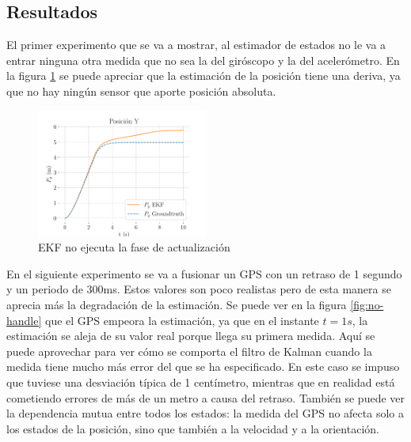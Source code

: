 \subsection{Resultados}

El primer experimento que se va a mostrar, al estimador de estados no le va a entrar ninguna otra medida que no sea la del giróscopo y la del acelerómetro. En la figura \ref{fig:simu1} se puede apreciar que la estimación de la posición tiene una deriva, ya que no hay ningún sensor que aporte posición absoluta. 


\begin{figure}[b]	
	\centering
		\centering
		\includegraphics[width=0.5\textwidth]{estimador_px4/im_simu/n_update/y_t}
	\quad
	\caption{EKF no ejecuta la fase de actualización}
	\label{fig:simu1}
\end{figure}


En el siguiente experimento se va a fusionar un GPS con un retraso de 1 segundo y un periodo de 300ms. Estos valores son poco realistas pero de esta manera se aprecia más la degradación de la estimación. Se puede ver en la figura \ref{fig:no-handle} que el GPS empeora la estimación, ya que en el instante $t=1s$, la estimación se aleja de su valor real porque llega su primera medida. Aquí se puede aprovechar para ver cómo se comporta el filtro de Kalman cuando la medida tiene mucho más error del que se ha especificado. En este caso se impuso que tuviese una desviación típica de 1 centímetro, mientras que en realidad está cometiendo errores de más de un metro a causa del retraso. También se puede ver la dependencia mutua entre todos los estados: la medida del GPS no afecta solo a los estados de la posición, sino que también a la velocidad y a la orientación.  

